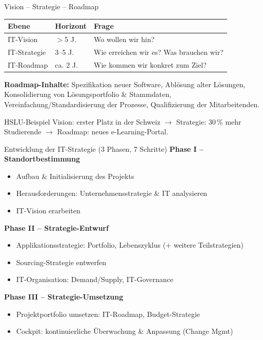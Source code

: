 \documentclass[a4paper, fontsize=7pt]{scrartcl}
\renewcommand*{\arraystretch}{1.5}  %
\begin{document}
\begin{mainbox}{Vision -- Strategie -- Roadmap}
\renewcommand*{\arraystretch}{1.2}
\begin{tabularx}{\linewidth}{@{}l|l|>{\raggedright\arraybackslash}X@{}}
\textbf{Ebene} & \textbf{Horizont} & \textbf{Frage} \\
\hline
IT-Vision & $>$5 J. & Wo wollen wir hin? \\
IT-Strategie & 3--5 J. & Wie erreichen wir es? Was brauchen wir? \\
IT-Roadmap & ca. 2 J. & Wie kommen wir konkret zum Ziel? \\
\end{tabularx}
\textbf{Roadmap-Inhalte:} Spezifikation neuer Software, Ablösung alter
Lösungen, Konsolidierung von Lösungsportfolio \& Stammdaten,
Vereinfachung/Standardisierung der Prozesse, Qualifizierung der Mitarbeitenden.
\end{mainbox}

\begin{subbox}{HSLU-Beispiel}
Vision: erster Platz in der Schweiz $\to$ Strategie: 30\,\% mehr Studierende
$\to$ Roadmap: neues e-Learning-Portal.
\end{subbox}

\begin{mainbox}{Entwicklung der IT-Strategie (3 Phasen, 7 Schritte)}
\textbf{Phase I -- Standortbestimmung}
\begin{itemize}
    \item[1] Aufbau \& Initialisierung des Projekts
    \item[2.1] Herausforderungen: Unternehmensstrategie \& IT analysieren
    \item[2.2] IT-Vision erarbeiten
\end{itemize}
\textbf{Phase II -- Strategie-Entwurf}
\begin{itemize}
    \item[3] Applikationsstrategie: Portfolio, Lebenszyklus (+ weitere
          Teilstrategien)
    \item[4] Sourcing-Strategie entwerfen
    \item[5] IT-Organisation: Demand/Supply, IT-Governance
\end{itemize}
\textbf{Phase III -- Strategie-Umsetzung}
\begin{itemize}
    \item[6] Projektportfolio umsetzen: IT-Roadmap, Budget-Strategie
    \item[7] Cockpit: kontinuierliche Überwachung \& Anpassung (Change Mgmt)
\end{itemize}
\end{mainbox}
\end{document}
